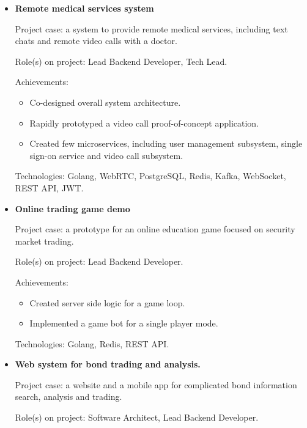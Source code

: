 \documentclass{article}
\begin{document}
\begin{itemize}
    \item {
        \textbf{Remote medical services system}
        
        Project case: a system to provide remote medical services, including text chats and remote video calls with a doctor.
        
        Role(s) on project: Lead Backend Developer, Tech Lead.
        
        Achievements:
        
            \begin{itemize}
                \item Co-designed overall system architecture.
                \item Rapidly prototyped a video call proof-of-concept application.
                \item Created few microservices, including user management subsystem, single sign-on service and video call subsystem.
            \end{itemize}
        
        Technologies: Golang, WebRTC, PostgreSQL, Redis, Kafka, WebSocket, REST API, JWT.
    }
    \item {
        \textbf{Online trading game demo}
        
        Project case: a prototype for an online education game focused on security market trading.
        
        Role(s) on project: Lead Backend Developer.
        
        Achievements:
        
            \begin{itemize}
                \item Created server side logic for a game loop.
                \item Implemented a game bot for a single player mode.
            \end{itemize}
        
        Technologies: Golang, Redis, REST API.
    }
    \item {
        \textbf{Web system for bond trading and analysis.}
        
        Project case: a website and a mobile app for complicated bond information search, analysis and trading.
        
        Role(s) on project: Software Architect, Lead Backend Developer.
        
}
\end{itemize}
\end{document}
